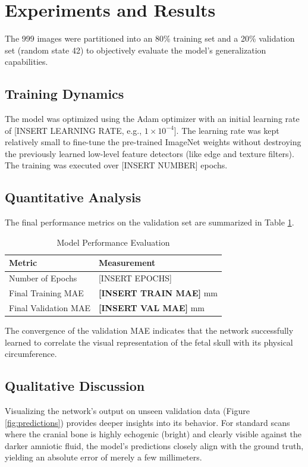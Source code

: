 \documentclass[10pt,twocolumn,letterpaper]{article}
\begin{document}
\section{Experiments and Results}
The 999 images were partitioned into an 80\% training set and a 20\% validation set (random state 42) to objectively evaluate the model's generalization capabilities.

\subsection{Training Dynamics}
The model was optimized using the Adam optimizer with an initial learning rate of [INSERT LEARNING RATE, e.g., $1 \times 10^{-4}$]. The learning rate was kept relatively small to fine-tune the pre-trained ImageNet weights without destroying the previously learned low-level feature detectors (like edge and texture filters). The training was executed over [INSERT NUMBER] epochs. 



\subsection{Quantitative Analysis}
The final performance metrics on the validation set are summarized in Table \ref{tab:results}. 

\begin{table}[H]
\centering
\caption{Model Performance Evaluation}
\label{tab:results}
\begin{tabular}{@{}ll@{}}
\toprule
\textbf{Metric} & \textbf{Measurement} \\ \midrule
Number of Epochs & [INSERT EPOCHS] \\
Final Training MAE & \textbf{[INSERT TRAIN MAE]} mm \\
Final Validation MAE & \textbf{[INSERT VAL MAE]} mm \\ \bottomrule
\end{tabular}
\end{table}

The convergence of the validation MAE indicates that the network successfully learned to correlate the visual representation of the fetal skull with its physical circumference. 

\subsection{Qualitative Discussion}
Visualizing the network's output on unseen validation data (Figure \ref{fig:predictions}) provides deeper insights into its behavior. For standard scans where the cranial bone is highly echogenic (bright) and clearly visible against the darker amniotic fluid, the model's predictions closely align with the ground truth, yielding an absolute error of merely a few millimeters. 
\end{document}
